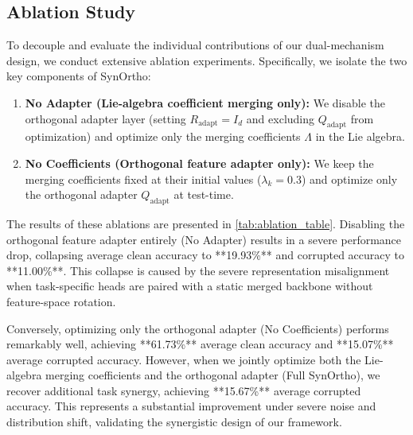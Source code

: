 \documentclass{article}
\theoremstyle{plain}
\theoremstyle{definition}
\theoremstyle{remark}
\begin{document}
\subsection{Ablation Study}
To decouple and evaluate the individual contributions of our dual-mechanism design, we conduct extensive ablation experiments. Specifically, we isolate the two key components of SynOrtho:
\begin{enumerate}
    \item \textbf{No Adapter (Lie-algebra coefficient merging only):} We disable the orthogonal adapter layer (setting $R_{\text{adapt}} = I_d$ and excluding $Q_{\text{adapt}}$ from optimization) and optimize only the merging coefficients $\Lambda$ in the Lie algebra.
    \item \textbf{No Coefficients (Orthogonal feature adapter only):} We keep the merging coefficients fixed at their initial values ($\lambda_k = 0.3$) and optimize only the orthogonal adapter $Q_{\text{adapt}}$ at test-time.
\end{enumerate}

The results of these ablations are presented in \cref{tab:ablation_table}. Disabling the orthogonal feature adapter entirely (No Adapter) results in a severe performance drop, collapsing average clean accuracy to **19.93\%** and corrupted accuracy to **11.00\%**. This collapse is caused by the severe representation misalignment when task-specific heads are paired with a static merged backbone without feature-space rotation. 

Conversely, optimizing only the orthogonal adapter (No Coefficients) performs remarkably well, achieving **61.73\%** average clean accuracy and **15.07\%** average corrupted accuracy. However, when we jointly optimize both the Lie-algebra merging coefficients and the orthogonal adapter (Full SynOrtho), we recover additional task synergy, achieving **15.67\%** average corrupted accuracy. This represents a substantial improvement under severe noise and distribution shift, validating the synergistic design of our framework.
\end{document}
